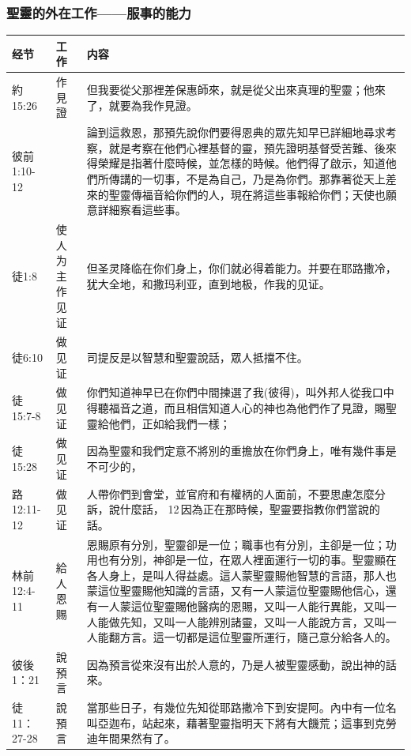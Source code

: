 \subsubsection{聖靈的外在工作——服事的能力}
\begin{table}[H]
\centering
\begin{tabular}{p{6em}|p{4em}|p{37em}}  \toprule
经节&工作&内容 \\  \midrule
約15:26&作見證&但我要從父那裡差保惠師來，就是從父出來真理的聖靈；他來了，就要為我作見證。 \\  \midrule

彼前1:10-12&&論到這救恩，那預先說你們要得恩典的眾先知早已詳細地尋求考察，就是考察在他們心裡基督的靈，預先證明基督受苦難、後來得榮耀是指著什麼時候，並怎樣的時候。他們得了啟示，知道他們所傳講的一切事，不是為自己，乃是為你們。那靠著從天上差來的聖靈傳福音給你們的人，現在將這些事報給你們；天使也願意詳細察看這些事。\\  \midrule



徒1:8&使人为主作见证&但圣灵降临在你们身上，你们就必得着能力。并要在耶路撒冷，犹大全地，和撒玛利亚，直到地极，作我的见证。\\  \midrule

徒6:10&做见证&司提反是以智慧和聖靈說話，眾人抵擋不住。\\  \midrule

徒15:7-8&做见证&你們知道神早已在你們中間揀選了我(彼得)，叫外邦人從我口中得聽福音之道，而且相信知道人心的神也為他們作了見證，賜聖靈給他們，正如給我們一樣；\\  \midrule
徒15:28&做见证&因為聖靈和我們定意不將別的重擔放在你們身上，唯有幾件事是不可少的，\\  \midrule

路12:11-12&做见证&人帶你們到會堂，並官府和有權柄的人面前，不要思慮怎麼分訴，說什麼話， 12 因為正在那時候，聖靈要指教你們當說的話。\\  \midrule

林前12:4-11&給人恩赐&恩賜原有分別，聖靈卻是一位；職事也有分別，主卻是一位；功用也有分別，神卻是一位，在眾人裡面運行一切的事。聖靈顯在各人身上，是叫人得益處。這人蒙聖靈賜他智慧的言語，那人也蒙這位聖靈賜他知識的言語，又有一人蒙這位聖靈賜他信心，還有一人蒙這位聖靈賜他醫病的恩賜，又叫一人能行異能，又叫一人能做先知，又叫一人能辨別諸靈，又叫一人能說方言，又叫一人能翻方言。這一切都是這位聖靈所運行，隨己意分給各人的。\\  \midrule
彼後1：21&說預言&因為預言從來沒有出於人意的，乃是人被聖靈感動，說出神的話來。\\  \midrule
徒11：27-28&說預言&當那些日子，有幾位先知從耶路撒冷下到安提阿。內中有一位名叫亞迦布，站起來，藉著聖靈指明天下將有大饑荒；這事到克勞迪年間果然有了。\\  \midrule


\end{tabular}
\end{table}
